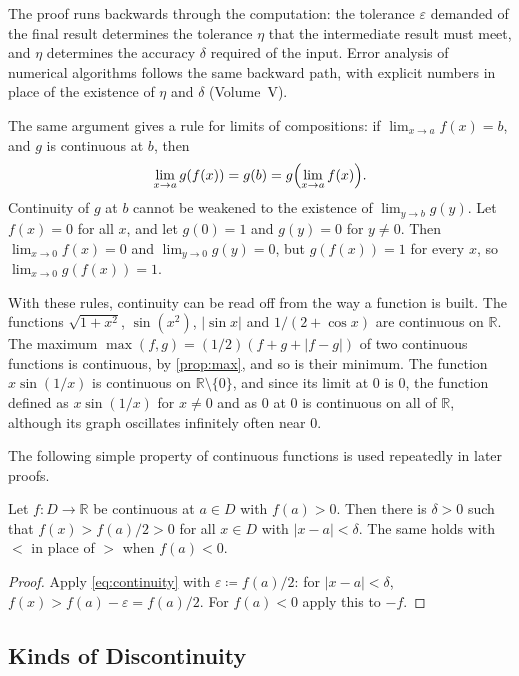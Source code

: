 The proof runs backwards through the computation: the tolerance $\varepsilon$ demanded of the final result determines the tolerance $\eta$ that the intermediate result must meet, and $\eta$ determines the accuracy $\delta$ required of the input. Error analysis of numerical algorithms follows the same backward path, with explicit numbers in place of the existence of $\eta$ and $\delta$ (Volume~V).

The same argument gives a rule for limits of compositions: if $\lim_{x\to a}f(x)=b$, and $g$ is continuous at $b$, then
\begin{equation}
\lim_{x\to a}g(f(x))=g(b)=g\Bigl(\lim_{x\to a}f(x)\Bigr).
\label{eq:limit-composition}
\end{equation}
Continuity of $g$ at $b$ cannot be weakened to the existence of $\lim_{y\to b}g(y)$. Let $f(x)=0$ for all $x$, and let $g(0)=1$ and $g(y)=0$ for $y\ne0$. Then $\lim_{x\to0}f(x)=0$ and $\lim_{y\to0}g(y)=0$, but $g(f(x))=1$ for every $x$, so $\lim_{x\to0}g(f(x))=1$.

With these rules, continuity can be read off from the way a function is built. The functions $\sqrt{1+x^2}$, $\sin(x^2)$, $|\sin x|$ and $1/(2+\cos x)$ are continuous on $\mathbb R$. The maximum $\max(f,g)=(1/2)(f+g+|f-g|)$ of two continuous functions is continuous, by \cref{prop:max}, and so is their minimum. The function $x\sin(1/x)$ is continuous on $\mathbb R\setminus\{0\}$, and since its limit at $0$ is $0$, the function defined as $x\sin(1/x)$ for $x\ne0$ and as $0$ at $0$ is continuous on all of $\mathbb R$, although its graph oscillates infinitely often near $0$.

The following simple property of continuous functions is used repeatedly in later proofs.

\begin{lemma}
\label{lem:sign-persistence}
Let $f\colon D\to\mathbb R$ be continuous at $a\in D$ with $f(a)>0$. Then there is $\delta>0$ such that $f(x)>f(a)/2>0$ for all $x\in D$ with $|x-a|<\delta$. The same holds with $<$ in place of $>$ when $f(a)<0$.
\end{lemma}

\begin{proof}
Apply \eqref{eq:continuity} with $\varepsilon\coloneqq f(a)/2$: for $|x-a|<\delta$, $f(x)>f(a)-\varepsilon=f(a)/2$. For $f(a)<0$ apply this to $-f$.
\end{proof}

\subsection{Kinds of Discontinuity}


